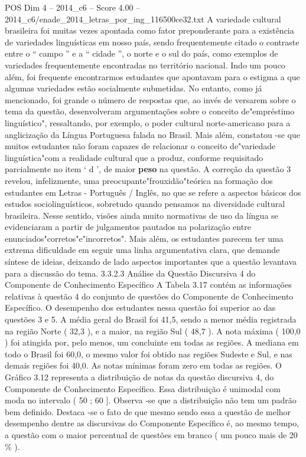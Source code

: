 \begin{textsample}{POS Dim 4 – 2014\_c6 – Score 4.00 – 2014\_c6/enade\_2014\_letras\_por\_ing\_116500ce32.txt}
A variedade cultural brasileira foi muitas vezes apontada como fator preponderante para a existência de variedades linguísticas em nosso país, sendo frequentemente citado o contraste entre o “ campo ” e a “ cidade ”, o norte e o sul do país, como exemplos de variedades frequentemente encontradas no território nacional.
Indo um pouco além, foi frequente encontrarmos estudantes que apontavam para o estigma a que algumas variedades estão socialmente submetidas.
No entanto, como já mencionado, foi grande o número de respostas que, ao invés de versarem sobre o tema da questão, desenvolveram argumentações sobre o conceito de"empréstimo linguístico", ressaltando, por exemplo, o poder cultural norte-americano para a anglicização da Língua Portuguesa falada no Brasil.
Mais além, constatou -se que muitos estudantes não foram capazes de relacionar o conceito de"variedade linguística"com a realidade cultural que a produz, conforme requisitado parcialmente no item ‘ d ’, de maior \textbf{peso} na questão.
A correção da questão 3 revelou, infelizmente, uma preocupante"frouxidão"teórica na formação dos estudantes em Letras - Português / Inglês, no que se refere a aspectos básicos dos estudos sociolinguísticos, sobretudo quando pensamos na diversidade cultural brasileira.
Nesse sentido, visões ainda muito normativas de uso da língua se evidenciaram a partir de julgamentos pautados na polarização entre enunciados"corretos"e"incorretos".
Mais além, os estudantes parecem ter uma extrema dificuldade em seguir uma linha argumentativa clara, que demande síntese de ideias, deixando de lado aspectos importantes que a questão levantava para a discussão do tema. 3.3.2.3 Análise da Questão Discursiva 4 do Componente de Conhecimento Específico A Tabela 3.17 contém as informações relativas à questão 4 do conjunto de questões do Componente de Conhecimento Específico.
O desempenho dos estudantes nessa questão foi superior ao das questões 3 e 5.
A média geral do Brasil foi 41,5, sendo a menor média registrada na região Norte ( 32,3 ), e a maior, na região Sul ( 48,7 ).
A nota máxima ( 100,0 ) foi atingida por, pelo menos, um concluinte em todas as regiões.
A mediana em todo o Brasil foi 60,0, o mesmo valor foi obtido nas regiões Sudeste e Sul, e nas demais regiões foi 40,0.
As notas mínimas foram zero em todas as regiões.
O Gráfico 3.12 representa a distribuição de notas da questão discursiva 4, do Componente de Conhecimento Específico.
Essa distribuição é unimodal com moda no intervalo ( 50 ; 60 ].
Observa -se que a distribuição não tem um padrão bem definido.
Destaca -se o fato de que mesmo sendo essa a questão de melhor desempenho dentre as discursivas do Componente Específico é, ao mesmo tempo, a questão com o maior percentual de questões em branco ( um pouco mais de 20 \% ).

\end{textsample}
